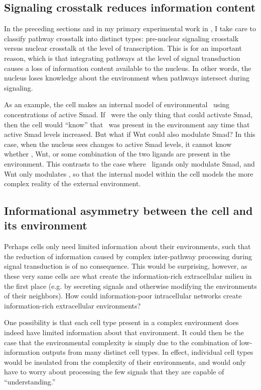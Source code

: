 \subsection{Signaling crosstalk reduces information content}


In the preceding sections and in my primary experimental work in
, I take care to classify pathway crosstalk
into distinct types: pre-nuclear signaling crosstalk versus nuclear
crosstalk at the level of transcription.
This is for an important reason, which is that
integrating pathways at the level of signal transduction
causes a loss of information content available to the nucleus.
In other words, the nucleus loses
knowledge about the environment when pathways intersect during signaling.


As an example, the cell makes an internal model of environmental \tgfbsf\
using concentrations of active Smad.
If \tgfbsf\ were the only thing that could activate Smad, then the cell
would ``know'' that \tgfbsf\ was present in the environment any time that
active Smad levels increased. But what if Wnt could also modulate Smad?
In this case, when the nucleus sees changes to active Smad levels, it cannot
know whether \tgfbsf, Wnt, or some combination of the two ligands are
present in the environment. This contrasts to the case where \tgfbsf\
ligands only modulate Smad, and Wnt only modulates \bcat, so that the
internal model within the cell models the more complex
reality of the external environment.


\subsection{Informational asymmetry between the cell and its environment}


Perhaps cells only need limited information about their environments,
such that the reduction of information caused by complex inter-pathway
processing during signal transduction is of no consequence. This would
be surprising, however, as these very same cells are what create the
information-rich extracellular milieu in the first place
(e.g. by secreting signals and otherwise modifying the environments of their
neighbors). How could information-poor
intracellular networks create information-rich extracellular environments?


One possibility is that each cell type present in a complex environment
does indeed have limited information about that environment. It could
then be the case that the environmental complexity is
simply due to the combination of low-information outputs from many distinct cell types.
In effect, individual cell types would be insulated from the complexity
of their environments, and would only have to worry about processing the
few signals that they are capable of ``understanding.''


